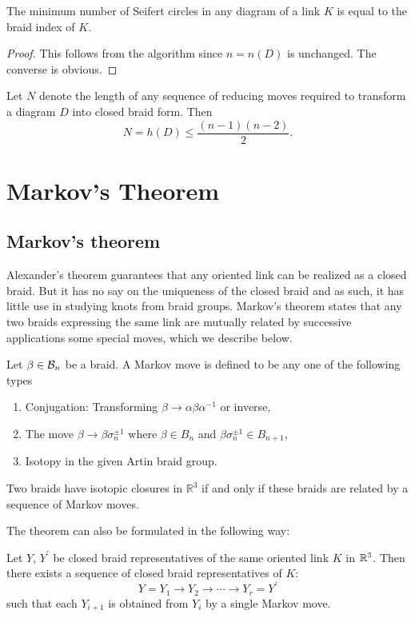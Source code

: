 \begin{corollary}
  The minimum number of Seifert circles in any diagram of a link $K$ is equal to the braid index of $K$.
\end{corollary}

\begin{proof}
This follows from the algorithm since $n = n(D)$ is unchanged. The converse is obvious.
\end{proof}

\begin{corollary}
Let $N$ denote the length of any sequence of reducing moves required to transform a diagram $D$ into closed braid form. Then 
\begin{displaymath}
N = h(D) \leq \frac{(n-1)(n-2)}{2}.
\end{displaymath}
\end{corollary}

\section{Markov's Theorem}
\label{Markov}

\subsection{Markov's theorem}

Alexander's theorem guarantees that any oriented link can be realized as a closed braid. But it has no say on the uniqueness of the closed braid and as such, it has little use in studying knots from braid groups. Markov's theorem states that any two braids expressing the same link are mutually related by successive applications some special moves, which we describe below.

Let $\beta \in \mathcal{B}_n$ be a braid. A Markov move is defined to be any one of the following types
\begin{enumerate}
\item\label{item:6} Conjugation: Transforming $\beta \to \alpha \beta \alpha^{-1}$ or inverse,
\item\label{item:10} The move $\beta \to \beta \sigma_n^{\pm 1}$ where $\beta \in B_n$ and $\beta \sigma_n^{\pm 1} \in B_{n+1}$,
\item\label{item:12} Isotopy in the given Artin braid group.
\end{enumerate}
\begin{theorem}[Markov]
    Two braids have isotopic closures in $\mathbb{R}^3$ if and only if these braids are related by a sequence of Markov moves.
  \end{theorem}
  The theorem can also be formulated in the following way:
\begin{theorem}[Markov]
\label{sec:markovs-theorem}
  Let $Y$, $Y^{\prime}$ be closed braid representatives of the same oriented link $K$ in $\mathbb{R}^3$. Then there exists a sequence of closed braid representatives of $K$: 
\begin{displaymath}
Y = Y_1 \to Y_2 \to \cdots \to Y_r = Y^{\prime}
\end{displaymath}
such that each $Y_{i+1}$ is obtained from $Y_i$ by a single Markov move.
\end{theorem}

